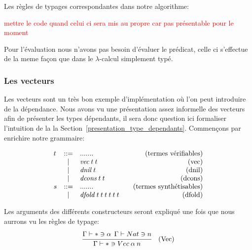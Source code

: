 \documentclass {article}
\makeatletter
\newcommand{\codefrom}[3]
           {}
\theoremstyle{definition}
\theoremstyle{remark}
\newcommand{\todo}[1]{\textcolor{red}{#1}}
\newenvironment{bnf}
               {\[\begin{array}{lcl@{\qquad}r}}
               {\end{array}\]}
\makeatother
\begin{document}
Les règles de typages correspondantes dans notre algorithme:

\todo{mettre le code quand celui ci sera mis au propre car pas présentable pour le moment}


Pour l'évaluation nous n'avons pas besoin d'évaluer le prédicat, celle ci s'effectue de la meme façon que 
dans le $\lambda$-calcul simplement typé.


\subsubsection{Les vecteurs}

Les vecteurs sont un très bon exemple d'implémentation où l'on peut introduire de la dépendance. Nous avons vu une 
présentation assez informelle
des vecteurs afin de présenter les types dépendants, il sera donc question ici formaliser l'intuition de la
la Section~\ref{presentation_type_dependants}. 
Commençons par enrichire notre grammaire:

\newcommand{\vect}{\mathit{vec}} 
\newcommand{\dnil}{\mathit{dnil}}
\newcommand{\dcons}{\mathit{dcons}}
\newcommand{\dfold}{\mathit{dfold}}

\begin{bnf}
  t &::= &....... &\mbox{(termes vérifiables)} \\
  &|& \vect\:t\:t & \mbox{(vec)} \\
  &|& \dnil\:t & \mbox{(dnil)} \\
  &|& \dcons\:t\:t & \mbox{(dcons)} \\
  s &::= &....... &\mbox{(termes synthétisables)} \\
  &|& \dfold\:t\:t\:t\:t\:t\:t & \mbox{(dfold)}
\end{bnf}

\codefrom{dependent}{lambda}{terme_vector}
\codefrom{dependent}{lambda}{terme_dfold}



Les arguments des différents constructeurs seront expliqué une fois que nous aurrons vu les 
règles de typage:
\begin{align*}
  &\cfrac{\Gamma\vdash * \ni \alpha\:\:\Gamma\vdash Nat \ni n}
  {\Gamma\vdash * \ni Vec\: \alpha\:n }&\mbox{(Vec)} \\
\end{align*}
\end{document}
